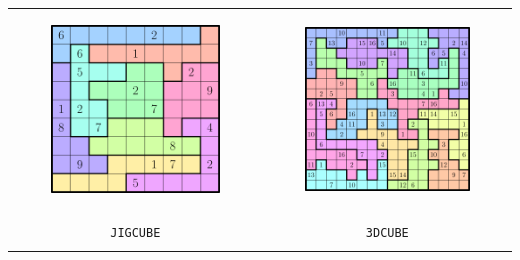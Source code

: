 \documentclass[12pt]{article}
\begin{document}
\begin{longtable}{cc}
\begin{minipage}{0.45\textwidth}	
	\begin{center}
		\includegraphics[width=0.7\textwidth]{jigsaw}	
	\end{center}
\end{minipage} &
\begin{minipage}{0.45\textwidth}	
	\begin{center}
		\includegraphics[width=0.7\textwidth]{jigsawxl}	
	\end{center}
\end{minipage} 
\\ \\
\texttt{JIGCUBE} & \texttt{3DCUBE}\\	
\begin{minipage}{0.45\textwidth}	
	\begin{center}

\end{center}
\end{minipage}
\end{longtable}
\end{document}
